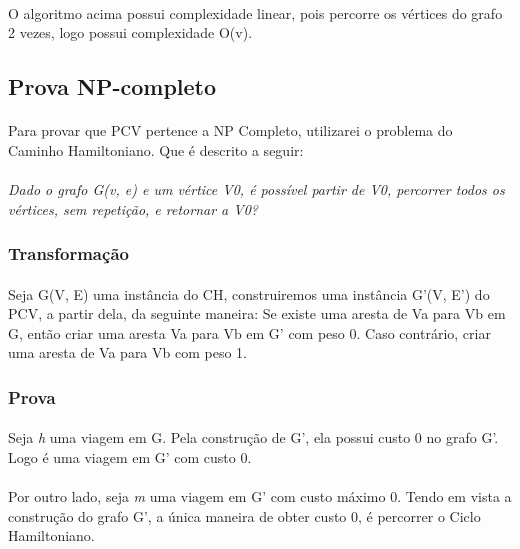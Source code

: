 \documentclass[a4paper, 12pt]{article}
\begin{document}
\paragraph{}
O algoritmo acima possui complexidade linear, pois percorre os vértices do grafo 2 vezes, logo possui complexidade O(v).

\subsection{Prova NP-completo}
\paragraph{}
Para provar que PCV pertence a NP Completo, utilizarei o problema do Caminho Hamiltoniano. Que é descrito a seguir:
\paragraph{}
\textit{Dado o grafo G(v, e) e um vértice V0, é possível partir de V0, percorrer todos os vértices, sem repetição, e retornar a V0?}

\subsubsection{Transformação}
\paragraph{}
Seja G(V, E) uma instância do CH, construiremos uma instância G'(V, E') do PCV, a partir dela, da seguinte maneira: Se existe uma aresta de Va para Vb em G, então criar uma aresta Va para Vb em G' com peso 0. Caso contrário, criar uma aresta de Va para Vb com peso 1.

\subsubsection{Prova}
\paragraph{}
Seja \textit{h} uma viagem em G. Pela construção de G', ela possui custo 0 no grafo G'. Logo é uma viagem em G' com custo 0.
\paragraph{}
Por outro lado, seja \textit{m} uma viagem em G' com custo máximo 0. Tendo em vista a construção do grafo G', a única maneira de obter custo 0, é percorrer o Ciclo Hamiltoniano.
\end{document}
